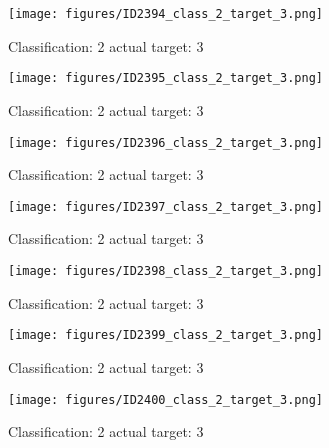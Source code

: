 \begin{figure}[h!]
\begin{center}
\texttt{[image: figures/ID2394\_class\_2\_target\_3.png]}
\end{center}
\caption{ Classification: 2 actual target: 3}
\label{fig:ID2394_class_2_target_3}
\end{figure}
\begin{figure}[h!]
\begin{center}
\texttt{[image: figures/ID2395\_class\_2\_target\_3.png]}
\end{center}
\caption{ Classification: 2 actual target: 3}
\label{fig:ID2395_class_2_target_3}
\end{figure}
\begin{figure}[h!]
\begin{center}
\texttt{[image: figures/ID2396\_class\_2\_target\_3.png]}
\end{center}
\caption{ Classification: 2 actual target: 3}
\label{fig:ID2396_class_2_target_3}
\end{figure}
\begin{figure}[h!]
\begin{center}
\texttt{[image: figures/ID2397\_class\_2\_target\_3.png]}
\end{center}
\caption{ Classification: 2 actual target: 3}
\label{fig:ID2397_class_2_target_3}
\end{figure}
\begin{figure}[h!]
\begin{center}
\texttt{[image: figures/ID2398\_class\_2\_target\_3.png]}
\end{center}
\caption{ Classification: 2 actual target: 3}
\label{fig:ID2398_class_2_target_3}
\end{figure}
\begin{figure}[h!]
\begin{center}
\texttt{[image: figures/ID2399\_class\_2\_target\_3.png]}
\end{center}
\caption{ Classification: 2 actual target: 3}
\label{fig:ID2399_class_2_target_3}
\end{figure}
\begin{figure}[h!]
\begin{center}
\texttt{[image: figures/ID2400\_class\_2\_target\_3.png]}
\end{center}
\caption{ Classification: 2 actual target: 3}
\label{fig:ID2400_class_2_target_3}
\end{figure}
